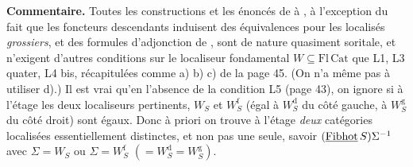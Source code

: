 \textbf{Commentaire.} Toutes les constructions et les énoncés de  à , à l’exception du fait que les foncteurs descendants induisent des équivalences pour les localisés \textit{grossiers}, et des formules d’adjonction de , sont de nature quasiment soritale, et n’exigent d’autres conditions sur le localiseur fondamental $W \subseteq \mathrm{Fl}\,\mathrm{Cat}$ que L1, L3 quater, L4 bis, récapitulées comme a) b) c) de la page 45. (On n’a même pas à utiliser d).) Il est vrai qu’en l’absence de la condition L5 (page 43), on ignore si à l’étage les deux localiseurs pertinents, $W_S$ et $W_S^{\mathrm{f}}$ (égal à $W_S^{\mathrm{d}}$ du côté gauche, à $W_S^{\mathrm{g}}$ du côté droit) sont égaux. Donc à priori on trouve à l’étage \textit{deux} catégories localisées essentiellement distinctes, et non pas une seule, savoir $(\underline{\mathrm{Fibhot}}\,S)\Sigma^{-1}$ avec $\Sigma = W_S$ ou $\Sigma = W_S^{\mathrm{f}}$ $(= W_S^{\mathrm{d}} = W_S^{\mathrm{g}})$.

